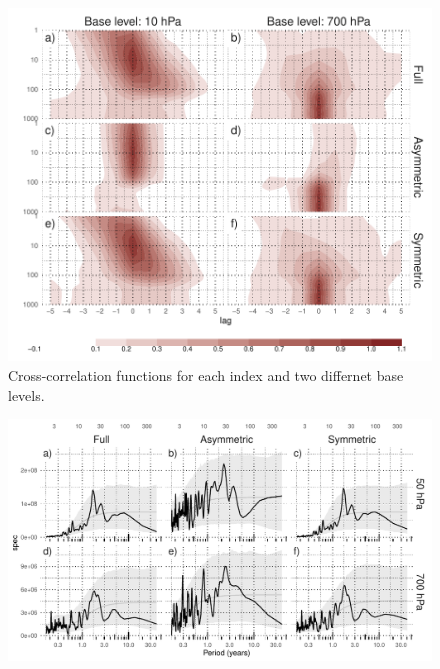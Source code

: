 \documentclass[twocol]{ametsocV5}
\begin{document}
\begin{figure}
\includegraphics{A2 ccf-levels-1} \caption[Cross-correlation functions for each index and two differnet base levels]{Cross-correlation functions for each index and two differnet base levels.}\label{fig:A2 ccf-levels}
\end{figure}

\begin{figure}
\includegraphics{A3-1} \label{fig:A3}
\end{figure}
\end{document}
